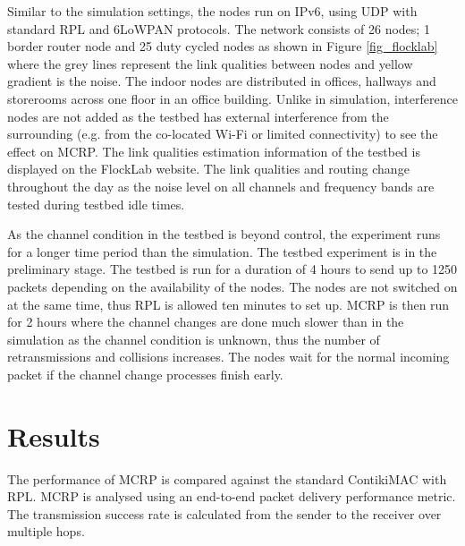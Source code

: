 Similar to the simulation settings, the nodes run on IPv6, using UDP with standard RPL and 6LoWPAN protocols. The network consists of 26 nodes; 1 border router node and 25 duty cycled nodes as shown in Figure \ref{fig_flocklab} where the grey lines represent the link qualities between nodes and yellow gradient is the noise. The indoor nodes are distributed in offices, hallways and storerooms across one floor in an office building. Unlike in simulation, interference nodes are not added as the testbed has external interference from the surrounding (e.g. from the co-located Wi-Fi or limited connectivity) to see the effect on MCRP. The link qualities estimation information of the testbed is displayed on the FlockLab website. The link qualities and routing change throughout the day as the noise level on all channels and frequency bands are tested during testbed idle times.

As the channel condition in the testbed is beyond control, the experiment runs for a longer time period than the simulation. The testbed experiment is in the preliminary stage. The testbed is run for a duration of 4 hours to send up to 1250 packets depending on the availability of the nodes. The nodes are not switched on at the same time, thus RPL is allowed ten minutes to set up. MCRP is then run for 2 hours where the channel changes are done much slower than in the simulation as the channel condition is unknown, thus the number of retransmissions and collisions increases. The nodes wait for the normal incoming packet if the channel change processes finish early.


\section{Results}
The performance of MCRP is compared against the standard ContikiMAC with RPL. MCRP is analysed using an end-to-end packet delivery performance metric. The transmission success rate is calculated from the sender to the receiver over multiple hops. 

